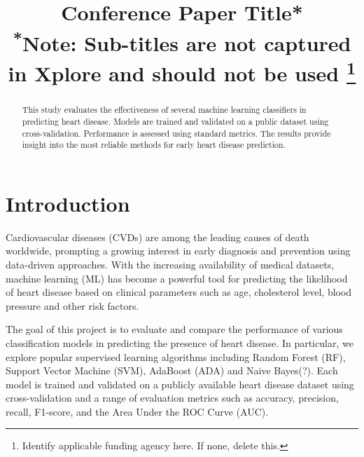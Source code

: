 \documentclass[conference]{IEEEtran}
\begin{document}
\title{Conference Paper Title*\\
{\footnotesize \textsuperscript{*}Note: Sub-titles are not captured in Xplore and
should not be used}
\thanks{Identify applicable funding agency here. If none, delete this.}
}

\author{
\and
{}
\and
{}
\and
{}
}

\maketitle

\begin{abstract}
This study evaluates the effectiveness of several machine learning classifiers in predicting heart disease. 
Models are trained and validated on a public dataset using cross-validation. 
Performance is assessed using standard metrics. 
The results provide insight into the most reliable methods for early heart disease prediction.
\end{abstract}



\begin{IEEEkeywords}

\end{IEEEkeywords}

\section{Introduction}

Cardiovascular diseases (CVDs) are among the leading causes of death worldwide, prompting a growing interest in 
early diagnosis and prevention using data-driven approaches. With the increasing availability of medical datasets, 
machine learning (ML) has become a powerful tool for predicting the likelihood of heart disease based 
on clinical parameters such as age, cholesterol level, blood pressure and other risk factors.

The goal of this project is to evaluate and compare the performance of various classification models 
in predicting the presence of heart disease. In particular, we explore popular supervised learning 
algorithms including Random Forest (RF), Support Vector Machine (SVM), AdaBoost (ADA) and Naive Bayes(?). Each model 
is trained and validated on a publicly available heart disease dataset using cross-validation and a 
range of evaluation metrics such as accuracy, precision, recall, F1-score, and the Area Under the ROC Curve (AUC).
\end{document}
